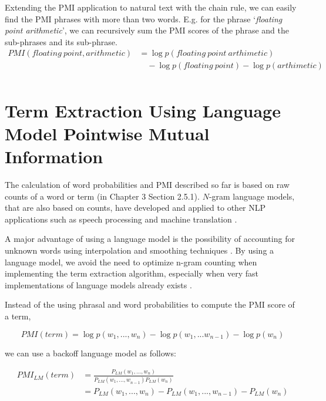 Extending the PMI application to natural text with the chain rule, we can easily find the PMI phrases with more than two words. E.g. for the phrase `\textit{floating point arithmetic}', we can recursively sum the PMI scores of the phrase and the sub-phrases and its sub-phrase.
\vspace{-2mm}
\begin{equation}
\begin{split}
PMI(floating \ point,arithmetic) 
& = \log { p(floating \ point \ arthimetic) } \\
& \quad- \log { p(floating \ point) } -\log { p(arthimetic) } \\ 
\end{split}
\end{equation}

\section{Term Extraction Using Language Model Pointwise Mutual Information}
The calculation of word probabilities and PMI described so far
is based on raw counts of a word or term (in Chapter 3 Section 2.5.1). 
$N$-gram language models, that are also based on counts, have developed and applied to other NLP applications such as speech processing and machine translation \citep[e.g.][]{smorgasbord,kirchhoff2005improved,schwenk2012large,lembersky2012adapting,chelba2012distributed}.

A major advantage of using a language model is the possibility of accounting for unknown words using interpolation and smoothing techniques \citep{chen1996empirical,chelba2010}. By using a language model, we avoid the need to optimize n-gram counting when implementing the term extraction algorithm, especially when very fast implementations of language models already exists \citep{kenlm}.

Instead of the using phrasal and word probabilities to compute the PMI score of a term, 

\begin{equation}
PMI(term) = \log { p(w_1,...,w_n) } -\log { p(w_1,...w_{n-1}) } -\log { p(w_n) } 
\end{equation}

we can use a backoff language model as follows:

\begin{equation}
\begin{split}
{ PMI }_{ LM }(term) & = \frac { P_{LM}({ w }_{ 1 },...,{ w }_{ n }) }{ P_{LM}({ w }_{ 1 },...{ ,w }_{ n-1 })P_{LM}({ w }_{ n }) }   \\
& = P_{LM}({ w }_{ 1 },...,{ w }_{ n }) -  P_{LM}({ w }_{ 1 },...,{ w }_{ n-1 }) - P_{LM}({ w }_{ n })
\end{split}
\end{equation}


